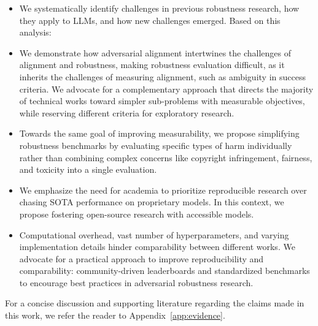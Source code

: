 \begin{itemize}[noitemsep,nolistsep,topsep=-2pt,leftmargin=0.6cm] 
    \item We systematically identify challenges in previous robustness research, how they apply to LLMs, and how new challenges emerged. Based on this analysis: 
    \item We demonstrate how adversarial alignment intertwines the challenges of alignment and robustness, making robustness evaluation difficult, as it inherits the challenges of measuring alignment, such as ambiguity in success criteria. 
    We advocate for a complementary approach that directs the majority of technical works toward simpler sub-problems with measurable objectives, while reserving different criteria for exploratory research.
    
    \item Towards the same goal of improving measurability, we propose simplifying robustness benchmarks by evaluating specific types of harm individually rather than combining complex concerns like copyright infringement, fairness, and toxicity into a single evaluation.
    
    \item We emphasize the need for academia to prioritize reproducible research over chasing SOTA performance on proprietary models. In this context, we propose fostering open-source research with accessible models. 
    
    \item Computational overhead, vast number of hyperparameters, and varying implementation details hinder comparability between different works. We advocate for a practical approach to improve reproducibility and comparability: community-driven leaderboards and standardized benchmarks to encourage best practices in adversarial robustness research.  
\end{itemize}

For a concise discussion and supporting literature regarding the claims made in this work, we refer the reader to Appendix~\ref{app:evidence}.


